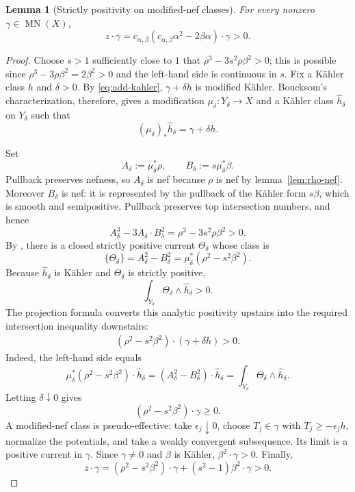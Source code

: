 \documentclass[reqno]{amsart}
\theoremstyle{remark}
\newcommand{\MN}{\operatorname{MN}}
\newcommand{\cab}{c_{\alpha,\beta}}
\theoremstyle{plain}
\newtheorem{lemma}[thm]{Lemma}
\begin{document}
\begin{lemma}[Strictly positivity on modified-nef classes]\label{lem:MN}
For every nonzero $\gamma\in\MN(X)$,
\[
 z\cdot \gamma=\cab(c_{\alpha,\beta}\alpha^2-2\beta\alpha)\cdot\gamma>0.
\]
\end{lemma}

\begin{proof}
Choose $s>1$ sufficiently close to $1$ that $
 \rho^3-3s^2\rho\beta^2>0$; 
this is possible since $\rho^3-3\rho\beta^2=2\beta^2>0$ and the left-hand side is continuous in $s$. Fix a K\"ahler class $h$ and $\delta>0$.  By
\eqref{eq:add-kahler}, $\gamma+\delta h$ is modified K\"ahler.
Boucksom's characterization, therefore, gives a modification
$\mu_\delta:Y_\delta\to X$ and a K\"ahler class
$\widehat h_\delta$ on $Y_\delta$ such that
\[
 (\mu_\delta)_*\widehat h_\delta=\gamma+\delta h.
\]

Set
\[
 A_\delta:=\mu_\delta^*\rho,\qquad
 B_\delta:=s\mu_\delta^*\beta.
\]
Pullback preserves nefness, so $A_\delta$ is nef because $\rho$ is
nef by lemma~\ref{lem:rho-nef}.  Moreover $B_\delta$ is nef:
it is represented by the pullback of the K\"ahler form $s\beta$,
which is smooth and semipositive.  Pullback preserves top intersection numbers,
and hence
\[
 A_\delta^3-3A_\delta\cdot B_\delta^2
 =\rho^3-3s^2\rho\beta^2>0.
\]
By \cite[lemma 2.4]{X16}, there is a closed strictly positive
current $\Theta_\delta$ whose class is
\[
 \{\Theta_\delta\}=A_\delta^2-B_\delta^2
 =\mu_\delta^*(\rho^2-s^2\beta^2).
\]
Because $\widehat h_\delta$ is K\"ahler and
$\Theta_\delta$ is strictly positive,
\[
 \int_{Y_\delta}\Theta_\delta\wedge\widehat h_\delta>0.
\]
The projection formula converts this analytic positivity upstairs into
the required intersection inequality downstairs:
\[
\begin{aligned}
 (\rho^2-s^2\beta^2)\cdot(\gamma+\delta h)>0.
\end{aligned}
\]
Indeed, the left-hand side equals
\[
 \mu_\delta^*(\rho^2-s^2\beta^2)\cdot\widehat h_\delta
 =(A_\delta^2-B_\delta^2)\cdot\widehat h_\delta
 =\int_{Y_\delta}\Theta_\delta\wedge\widehat h_\delta.
\]
Letting $\delta\downarrow0$ gives
\[
 (\rho^2-s^2\beta^2)\cdot\gamma\geq0.
\]
A modified-nef class is pseudo-effective: take
$\epsilon_j\downarrow0$, choose
$T_j\in\gamma$ with $T_j\geq-\epsilon_jh$, normalize the potentials,
and take a weakly convergent subsequence.  Its limit is a positive current
in $\gamma$.  Since $\gamma\neq0$ and $\beta$ is K\"ahler,
 $\beta^2\cdot\gamma>0$.  Finally,
\[
 z\cdot\gamma
 =(\rho^2-s^2\beta^2)\cdot\gamma
   +(s^2-1)\beta^2\cdot\gamma>0.
\]
\end{proof}
\end{document}
